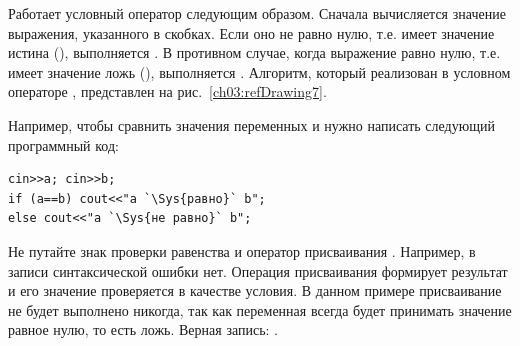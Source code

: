 Работает условный оператор следующим образом. Сначала вычисляется значение выражения, указанного в скобках. Если
оно не равно нулю, т.е. имеет значение истина (), выполняется . В
противном случае, когда выражение равно нулю, т.е. имеет значение ложь (), выполняется
. Алгоритм, который реализован в условном операторе , представлен на
рис.~\ref{ch03:refDrawing7}.


Например, чтобы сравнить значения переменных  и  нужно написать следующий
программный код:
\begin{lstlisting}
cin>>a; cin>>b;
if (a==b) cout<<"a `\Sys{равно}` b";
else cout<<"a `\Sys{не равно}` b";
\end{lstlisting}

 Не путайте знак проверки равенства \Sys{==} и оператор присваивания
\Sys{=}. Например, в записи  синтаксической ошибки нет. Операция
присваивания  формирует результат и его значение проверяется в качестве условия. В данном примере
присваивание  не будет выполнено никогда, так как переменная  всегда будет
принимать значение равное нулю, то есть ложь. Верная запись: 
.

